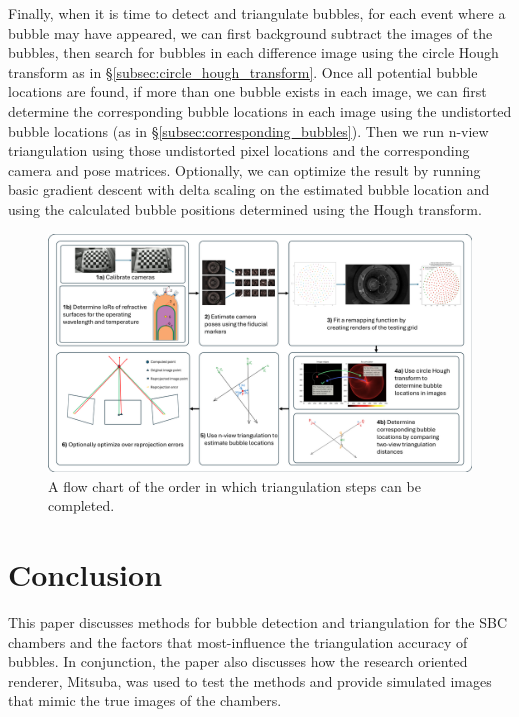 \documentclass[11pt, letterpaper]{extarticle} %
\begin{document}
Finally, when it is time to detect and triangulate bubbles, for each event where a bubble may have appeared, we can first background subtract the images of the bubbles, then search for bubbles in each difference image using the circle Hough transform as in \S\ref{subsec:circle_hough_transform}. Once all potential bubble locations are found, if more than one bubble exists in each image, we can first determine the corresponding bubble locations in each image using the undistorted bubble locations (as in \S\ref{subsec:corresponding_bubbles}). Then we run n-view triangulation using those undistorted pixel locations and the corresponding camera and pose matrices. Optionally, we can optimize the result by running basic gradient descent with delta scaling on the estimated bubble location and using the calculated bubble positions determined using the Hough transform. 


\begin{figure}
    \centering
    \includegraphics[width=\linewidth]{localization_flow_chart_2.png}
    \caption{A flow chart of the order in which triangulation steps can be completed.}
    \label{fig:localization_flow_chart}
\end{figure}


\section{Conclusion} \label{sec:conclusion}
This paper discusses methods for bubble detection and triangulation for the SBC chambers and the factors that most-influence the triangulation accuracy of bubbles. In conjunction, the paper also discusses how the research oriented renderer, Mitsuba, was used to test the methods and provide simulated images that mimic the true images of the chambers. 
\end{document}
